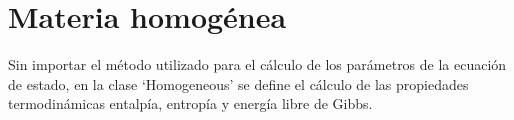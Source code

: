 \section{Materia homogénea}\label{sec:homogeneous}

	Sin importar el método utilizado para el cálculo de los parámetros de la ecuación de estado, en la clase `Homogeneous' se define el cálculo de las propiedades termodinámicas entalpía, entropía y energía libre de Gibbs.

	